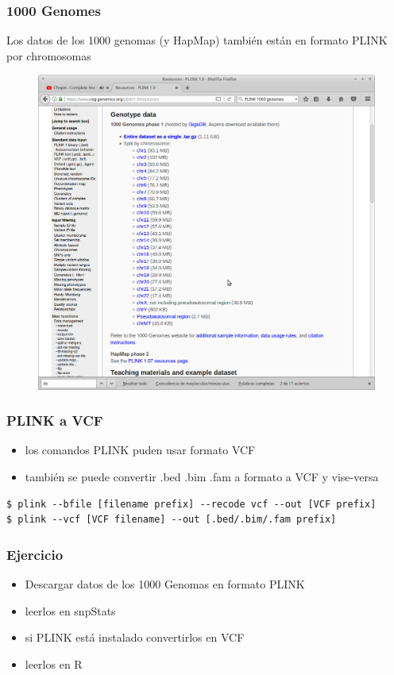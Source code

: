 \documentclass{beamer}\usepackage[]{graphicx}\usepackage[]{color}
\begin{document}
\begin{frame}[fragile]
\frametitle{1000 Genomes}
Los datos de los 1000 genomas (y HapMap) tambi\'en est\'an en formato PLINK por chromosomas
\begin{figure}[htbp]
\begin{center}
\includegraphics[width=.7\linewidth]{plink1kgenomes.png}
\end{center}
\end{figure}

\end{frame}


\begin{frame}[fragile]
\frametitle{PLINK a VCF}
\begin{itemize}
\item los comandos PLINK puden usar formato VCF
\item tambi\'en se puede convertir .bed .bim .fam a formato a VCF y vise-versa
\end{itemize}

{\scriptsize
\begin{verbatim}
$ plink --bfile [filename prefix] --recode vcf --out [VCF prefix]
$ plink --vcf [VCF filename] --out [.bed/.bim/.fam prefix]
\end{verbatim}
}

\end{frame}

\begin{frame}[fragile]
\frametitle{Ejercicio}
\begin{itemize}
\item Descargar datos de los 1000 Genomas en formato PLINK 
\item leerlos en snpStats
\item si PLINK est\'a instalado convertirlos en VCF
\item leerlos en R
\end{itemize}
\end{frame}
\end{document}
